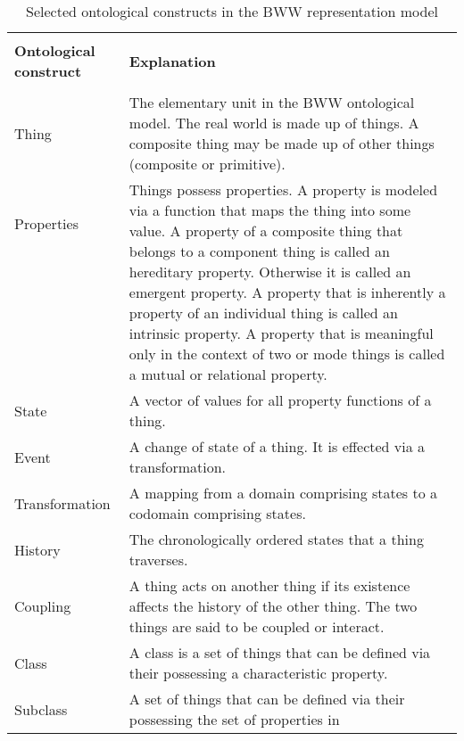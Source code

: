 \begin{center}
\begin{longtable}{ | p{11em} | p{30em} | } 
\caption{Selected ontological constructs in the BWW representation model}
\label{tab:bwwmodel}\\
\hline
 &  \\
\textbf{Ontological construct} & \textbf{Explanation} \\
 &  \\
\hline
Thing & The elementary unit in the BWW ontological model. The real world is made up of things. A composite thing may be made up of other things (composite or primitive).~\cite{wand1995deep} \\ 
\hline
Properties & \multirow{7}{30em}{Things possess properties. A property is modeled via a function that maps the thing into some value. A property of a composite thing that belongs to a component thing is called an hereditary property. Otherwise it is called an emergent property. A property that is inherently a property of an individual thing is called an intrinsic property. A property that is meaningful only in the context of two or mode things is called a mutual or relational property.~\cite{wand1995deep}} \\ 
 &  \\ 
 &  \\
 &  \\
 &  \\
 &  \\
 &  \\
 \hline
 State & A vector of values for all property functions of a thing.~\cite{wand1995deep} \\
 \hline
 Event & A change of state of a thing. It is effected via a transformation.~\cite{wand1995deep} \\
 \hline
 Transformation & A mapping from a domain comprising states to a codomain comprising states.~\cite{wand1995deep} \\
 \hline
 History & The chronologically ordered states that a thing traverses.~\cite{weber1996analytical} \\
 \hline
 Coupling & A thing acts on another thing if its existence affects the history of the other thing. The two things are said to be coupled or interact.~\cite{wand1995deep} \\
 \hline
 Class & A class is a set of things that can be defined via their possessing a characteristic property.~\cite{weber1996analytical} \\ 
 \hline
 Subclass & A set of things that can be defined via their possessing the set of properties in

\end{longtable}
\end{center}
